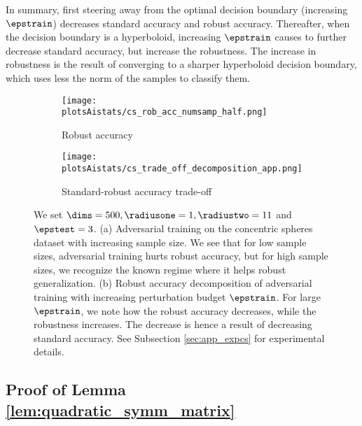 In summary, first steering away from the optimal decision boundary (increasing $\epstrain$) decreases standard accuracy and robust accuracy. Thereafter, when the decision boundary is a hyperboloid, increasing $\epstrain$ causes to further decrease standard accuracy, but increase the robustness. The increase in robustness is the result of converging to a sharper hyperboloid decision boundary, which uses less the norm of the samples to classify them.

\begin{figure}[!b]
\vskip 0.2in
\centering
\begin{subfigure}[b]{0.49\textwidth}
  \texttt{[image: plotsAistats/cs\_rob\_acc\_numsamp\_half.png]}
  \caption{Robust accuracy}
  \label{fig:numobs}
\end{subfigure}
\begin{subfigure}[b]{0.49\textwidth}
  \texttt{[image: plotsAistats/cs\_trade\_off\_decomposition\_app.png]}
  \caption{Standard-robust accuracy trade-off}
  \label{fig:cs_trade_off}
\end{subfigure}

\caption{ We set $\dims =  500, \radiusone = 1, \radiustwo = 11$ and $\epstest = 3$. (a) Adversarial training on the concentric spheres dataset with increasing sample size. We see that for low sample sizes, adversarial training hurts robust accuracy, but for high sample sizes, we recognize the known regime where it helps robust generalization. (b) Robust accuracy decomposition of adversarial training with increasing perturbation budget $\epstrain$. For large $\epstrain$, we note how the robust accuracy decreases, while the robustness increases. The decrease is hence a result of decreasing standard accuracy. See Subsection \ref{sec:app_expcs} for experimental details.}
\label{fig:numobs_trade_off}
\end{figure}

\subsection{Proof of Lemma \ref{lem:quadratic_symm_matrix}}
\label{subsec:proof_lemma}

